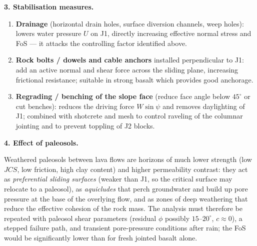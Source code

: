 \documentclass[11pt]{article}
\begin{document}
\begin{corrige}
\textbf{3. Stabilisation measures.}
\begin{enumerate}
\item \textbf{Drainage} (horizontal drain holes, surface diversion channels, weep holes): lowers water pressure $U$ on J1, directly increasing effective normal stress and FoS --- it attacks the controlling factor identified above.
\item \textbf{Rock bolts / dowels and cable anchors} installed perpendicular to J1: add an active normal and shear force across the sliding plane, increasing frictional resistance; suitable in strong basalt which provides good anchorage.
\item \textbf{Regrading / benching of the slope face} (reduce face angle below $45^\circ$ or cut benches): reduces the driving force $W\sin\psi$ and removes daylighting of J1; combined with shotcrete and mesh to control raveling of the columnar jointing and to prevent toppling of J2 blocks.
\end{enumerate}

\textbf{4. Effect of paleosols.}\par
Weathered paleosols between lava flows are horizons of much lower strength (low $JCS$, low friction, high clay content) and higher permeability contrast: they act as \emph{preferential sliding surfaces} (weaker than J1, so the critical surface may relocate to a paleosol), as \emph{aquicludes} that perch groundwater and build up pore pressure at the base of the overlying flow, and as zones of deep weathering that reduce the effective cohesion of the rock mass. The analysis must therefore be repeated with paleosol shear parameters (residual $\phi$ possibly $15$--$20^\circ$, $c \approx 0$), a stepped failure path, and transient pore-pressure conditions after rain; the FoS would be significantly lower than for fresh jointed basalt alone.
\end{corrige}
\end{document}
